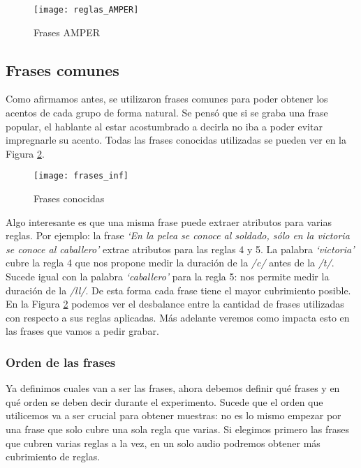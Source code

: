 \begin{figure}[h!]
    \centerline{\texttt{[image: reglas\_AMPER]} }
    \caption{Frases AMPER}
    \label{fig21}
\end{figure}

\subsection{Frases comunes}

Como afirmamos antes, se utilizaron frases comunes para poder obtener los acentos de cada grupo de forma natural. Se pensó que si se graba una frase popular, el hablante al estar acostumbrado a decirla no iba a poder evitar impregnarle su acento. Todas las frases conocidas utilizadas se pueden ver en la Figura \ref{fig22}.

\begin{figure}[h!]
    \centerline{\texttt{[image: frases\_inf]} }
    \caption{Frases conocidas}
    \label{fig22}
\end{figure}

Algo interesante es que una misma frase puede extraer atributos para varias reglas. Por ejemplo: la frase \textit{`En la pelea se conoce al soldado, sólo en la victoria se conoce al caballero’} extrae atributos para las reglas 4 y 5. La palabra \textit{`victoria’} cubre la regla 4 que nos propone medir la duración de la \textit{/c/} antes de la \textit{/t/}. Sucede igual con la palabra \textit{`caballero’} para la regla 5: nos permite medir la duración de la \textit{/ll/}. De esta forma cada frase tiene el mayor cubrimiento posible. En la Figura \ref{fig22} podemos ver el desbalance entre la cantidad de frases utilizadas con respecto a sus reglas aplicadas. Más adelante veremos como impacta esto en las frases que vamos a pedir grabar.

\subsubsection{Orden de las frases}

Ya definimos cuales van a ser las frases, ahora debemos definir qué frases y en qué orden se deben decir durante el experimento. Sucede que el orden que utilicemos va a ser crucial para obtener muestras: no es lo mismo empezar por una frase que solo cubre una sola regla que varias. Si elegimos primero las frases que cubren varias reglas a la vez, en un solo audio podremos obtener más cubrimiento de reglas. 

